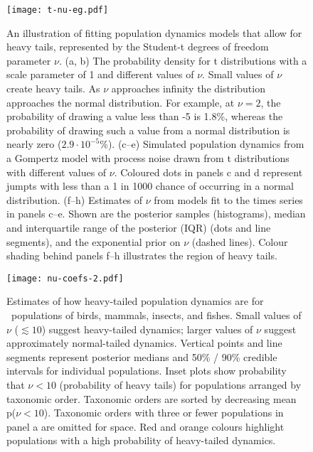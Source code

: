 

\begin{figure}[htbp]
\begin{center}
\texttt{[image: t-nu-eg.pdf]}
\caption{
An illustration of fitting population dynamics models that allow for heavy tails, represented by the Student-t degrees of freedom parameter $\nu$.
(a, b) The probability density for t distributions with a scale parameter of 1 and different values of $\nu$.
Small values of $\nu$ create heavy tails.
As $\nu$ approaches infinity the distribution approaches the normal distribution.
For example, at $\nu = 2$, the probability of drawing a value less than -5 is 1.8\%, whereas the probability of drawing such a value from a normal distribution is nearly zero ($2.9\cdot10^{-5}$\%).
(c--e) Simulated population dynamics from a Gompertz model with process noise drawn from t distributions with different values of $\nu$.
Coloured dots in panels c and d represent jumpts with less than a 1 in 1000 chance of occurring in a normal distribution.
(f--h) Estimates of $\nu$ from models fit to the times series in panels c--e.
Shown are the posterior samples (histograms), median and interquartile range of the posterior (IQR) (dots and line segments), and the exponential prior on $\nu$ (dashed lines).
Colour shading behind panels f--h illustrates the region of heavy tails.}
\label{fig:didactic}
\end{center}
\end{figure}

\clearpage

\begin{figure}[htbp]
\begin{center}
\texttt{[image: nu-coefs-2.pdf]}
\caption{
Estimates of how heavy-tailed population dynamics are for \nuCoefPopN\ populations of birds, mammals, insects, and fishes.
Small values of $\nu$ ($\lesssim 10$) suggest heavy-tailed dynamics; larger values of $\nu$ suggest approximately normal-tailed dynamics.
Vertical points and line segments represent posterior medians and 50\% / 90\% credible intervals for individual populations.
Inset plots show probability that $\nu < 10$ (probability of heavy tails) for populations arranged by taxonomic order.
Taxonomic orders are sorted by decreasing mean p($\nu < 10$).
Taxonomic orders with three or fewer populations in panel a are omitted for space.
Red and orange colours highlight populations with a high probability of heavy-tailed dynamics.
}
\label{fig:nu-coefs}
\end{center}
\end{figure}

